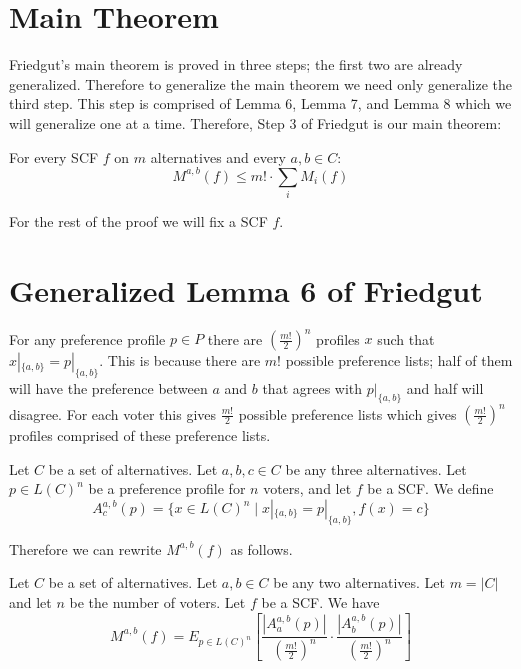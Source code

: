 \section{Main Theorem}

	Friedgut's main theorem is proved in three steps; the first two are already generalized. Therefore to generalize the main theorem we need only generalize the third step. This step is comprised of Lemma 6, Lemma 7, and Lemma 8 which we will generalize one at a time. Therefore, Step 3 of Friedgut is our main theorem:

	\begin{theorem}
		For every SCF $f$ on $m$ alternatives and every $a, b \in C$:
		\[
			M^{a, b}(f) \le m! \cdot \sum_i M_i(f)
		\]
	\end{theorem}

	For the rest of the proof we will fix a SCF $f$.


\section{Generalized Lemma 6 of Friedgut}

	For any preference profile $p \in P$ there are $(\frac{m!}{2})^n$ profiles $x$ such that $x|_{\{a, b\}} = p|_{\{a, b\}}$. This is because there are $m!$ possible preference lists; half of them will have the preference between $a$ and $b$ that agrees with $p|_{\{a, b\}}$ and half will disagree. For each voter this gives $\frac{m!}{2}$ possible preference lists which gives $(\frac{m!}{2})^n$ profiles comprised of these preference lists.

	\begin{definition}
		Let $C$ be a set of alternatives. Let $a, b, c \in C$ be any three alternatives. Let $p \in L(C)^n$ be a preference profile for $n$ voters, and let $f$ be a SCF. We define
		\[
			A^{a,b}_c(p) = \{x \in L(C)^n \mid x|_{\{a,b\}} = p|_{\{a,b\}}, f(x) = c\}
		\]
	\end{definition}

	Therefore we can rewrite $M^{a,b}(f)$ as follows.

	\begin{lemma}
		\label{friedgut-lemma-6}
		Let $C$ be a set of alternatives. Let $a, b \in C$ be any two alternatives. Let $m = |C|$ and let $n$ be the number of voters. Let $f$ be a SCF. We have
		\[
			M^{a,b}(f) = E_{p \in L(C)^n} \left[ \frac{|A^{a,b}_a(p)|}{\left(\frac{m!}{2}\right)^n} \cdot \frac{|A^{a,b}_b(p)|}{\left(\frac{m!}{2}\right)^n} \right]
		\]
	\end{lemma}

